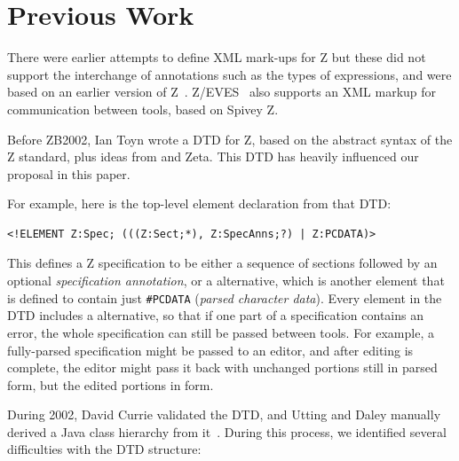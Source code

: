 \documentclass{llncs}  %
\newcommand{\Zeta}{Zeta}
\begin{document}
\section{Previous Work}

There were earlier attempts to define XML mark-ups for Z
\cite{Wordsworth99,Dong01} but these did not support the interchange of
annotations such as the types of expressions, and were based on an earlier
version of Z~\cite{spivey:z-notation2}. 
Z/EVES~\cite{saaltink:zeves-system} also supports an XML markup for
communication between tools, based on Spivey Z.

Before ZB2002, Ian Toyn wrote a DTD for Z, based on the abstract
syntax of the Z standard, plus ideas from \CADiZ and \Zeta.  This
DTD has heavily influenced our proposal in this paper.

For example, here is the top-level element declaration from that DTD:
\begin{small}
\begin{verbatim}
<!ELEMENT Z:Spec; (((Z:Sect;*), Z:SpecAnns;?) | Z:PCDATA)>
\end{verbatim}
\end{small}

This defines a Z specification to be either a sequence of sections
followed by an optional \emph{specification annotation}, or a
 alternative, which is another element that is defined 
to contain just \verb!#PCDATA! (\textit{parsed character data}).
Every element in the DTD includes a  alternative, so
that if one part of a specification contains an error, the whole
specification can still be passed between tools.  For example,
a fully-parsed specification might be passed to an editor, and after
editing is complete, the editor might pass it back with unchanged
portions still in parsed form, but the edited portions in 
form. 

During 2002, David Currie validated the DTD, and Utting and Daley
manually derived a Java class hierarchy from it~\cite{daley:report02}.
During this process, we identified several difficulties with the
DTD structure:
\end{document}
